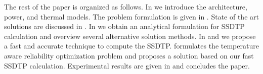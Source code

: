 The rest of the paper is organized as follows. In  we introduce the architecture, power, and thermal models. The problem formulation is given in . State of the art solutions are discussed in . In  we obtain an analytical formulation for SSDTP calculation and overview several alternative solution methods. In  and  we propose a fast and accurate technique to compute the SSDTP.  formulates the temperature aware reliability optimization problem and proposes a solution based on our fast SSDTP calculation. Experimental results are given in  and  concludes the paper.

